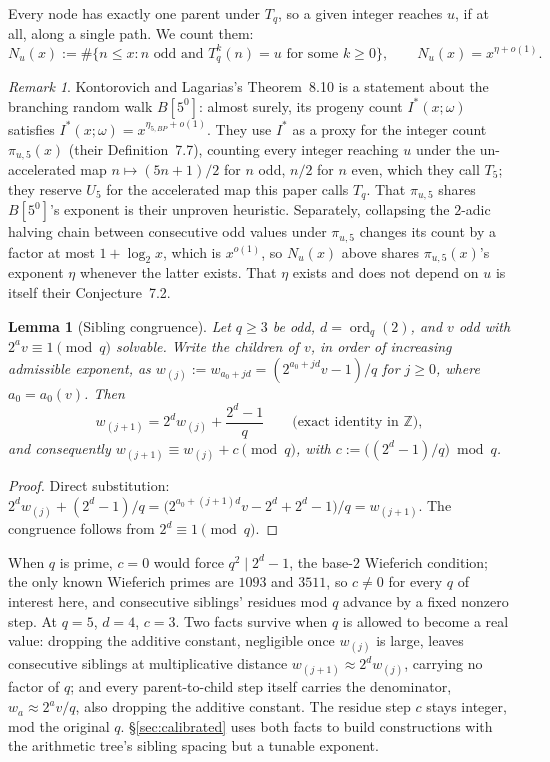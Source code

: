 \documentclass[11pt]{article}
\newtheorem{lemma}[theorem]{Lemma}
\theoremstyle{remark}
\newtheorem{remark}[theorem]{Remark}
\DeclareMathOperator{\ord}{ord}
\begin{document}
Every node has exactly one parent under $T_q$, so a given integer
reaches $u$, if at all, along a single path. We count them:
\[
 N_u(x):=\#\{n\le x:n\text{ odd and }T_q^k(n)=u
                    \text{ for some }k\ge0\},
 \qquad
 N_u(x)=x^{\eta+o(1)}.
\]

\begin{remark}
Kontorovich and Lagarias's Theorem~8.10 is a statement about the
branching random walk $B[5^0]$: almost surely, its progeny count
$I^\ast(x;\omega)$ satisfies $I^\ast(x;\omega)=x^{\eta_{5,BP}+o(1)}$.
They use $I^\ast$ as a proxy for the integer count $\pi_{u,5}(x)$
(their Definition~7.7), counting every integer reaching $u$ under the
un-accelerated map
$n\mapsto(5n+1)/2$ for $n$ odd, $n/2$ for $n$ even, which they call
$T_5$; they reserve $U_5$ for the accelerated map this paper calls
$T_q$. That $\pi_{u,5}$
shares $B[5^0]$'s exponent is their unproven heuristic.
Separately, collapsing the $2$-adic halving chain between consecutive
odd values under $\pi_{u,5}$ changes its count by a factor at most
$1+\log_2x$, which is $x^{o(1)}$, so $N_u(x)$ above shares
$\pi_{u,5}(x)$'s exponent $\eta$ whenever the latter exists. That
$\eta$ exists and does not depend on $u$ is itself their Conjecture~7.2.
\end{remark}

\begin{lemma}[Sibling congruence]
\label{lem:sibling-congruence}
Let $q\ge3$ be odd, $d=\ord_q(2)$, and $v$ odd with $2^av\equiv1\pmod
q$ solvable. Write the children of $v$, in order of increasing
admissible exponent, as $w_{(j)}:=w_{a_0+jd}=(2^{a_0+jd}v-1)/q$ for
$j\ge0$, where $a_0=a_0(v)$. Then
\[
  w_{(j+1)} = 2^d w_{(j)} + \frac{2^d-1}{q} \qquad\text{(exact identity
  in $\mathbb Z$)},
\]
and consequently $w_{(j+1)}\equiv w_{(j)}+c\pmod q$, with
$c:=\bigl((2^d-1)/q\bigr)\bmod q$.
\end{lemma}

\begin{proof}
Direct substitution: $2^d w_{(j)}+(2^d-1)/q =
\bigl(2^{a_0+(j+1)d}v-2^d+2^d-1\bigr)/q = w_{(j+1)}$. The congruence
follows from $2^d\equiv1\pmod q$.
\end{proof}

When $q$ is prime, $c=0$ would force $q^2\mid2^d-1$, the base-$2$
Wieferich condition; the only known Wieferich primes are $1093$ and
$3511$, so $c\ne0$ for every $q$ of interest here, and consecutive
siblings' residues mod $q$ advance by a fixed nonzero step. At $q=5$,
$d=4$, $c=3$. Two facts survive when $q$ is allowed to become a real
value: dropping the additive constant, negligible once
$w_{(j)}$ is large, leaves consecutive siblings at multiplicative
distance $w_{(j+1)}\approx2^dw_{(j)}$, carrying no factor of $q$; and every
parent-to-child step itself carries the denominator,
$w_a\approx2^av/q$, also dropping the additive constant. The residue
step $c$ stays integer, mod the original $q$.
\S\ref{sec:calibrated} uses both facts to build constructions with the
arithmetic tree's sibling spacing but a tunable exponent.
\end{document}
